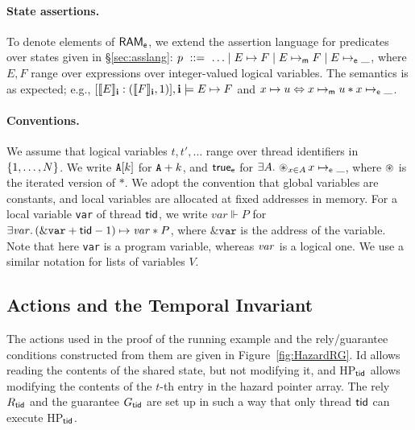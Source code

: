 \paragraph{State assertions.}
To denote elements of ${\sf RAM}_{{\sf e}}$, we extend the assertion language for
predicates over states given in \S\ref{sec:asslang}: $p \ ::=\ \ldots \mid E
\mapsto F \mid E \mapsto_{{\sf m}} F \mid E \mapsto_{{\sf e}} \_$, where $E, F$ range
over expressions over integer-valued logical variables. The semantics is as
expected; e.g., $[\llbracket E \rrbracket_{{\bf i}} : (\llbracket F \rrbracket_{{\bf i}}, 1)],{\bf i} \models E \mapsto F$
and $x \mapsto u \Leftrightarrow x \mapsto_{\sf m} u * x \mapsto_{\sf e} \_$.



\paragraph{Conventions.}
We assume that logical variables $t, t', \ldots$ range over
thread identifiers in $\{1, \ldots, N\}$. We write ${\tt A}[k]$ for
${\tt A}+k$, and $\mathsf{true}_{\sf e}$ for $\exists A.\,\mathop{\circledast}\limits\nolimits_{x \in
  A}x\mapsto_{{\sf e}}\_$, where $\mathop{\circledast}\limits$ is the iterated version of $*$. We adopt
the convention that global variables are constants, and local variables are
allocated at fixed addresses in memory.  For a local variable {\tt var} of
thread ${\sf tid}$, we write $\mathit{var} \Vdash P$ for $\exists \mathit{var}.\,
(\&{\tt var}+{\sf tid}-1) \mapsto \mathit{var} * P$, where $\&\mathtt{var}$ is the address
of the variable. Note that here {\tt var} is a program variable, whereas ${\it
  var}$ is a logical one. We use a similar notation for lists of variables $V$.



\subsection{Actions and the Temporal Invariant \label{sec:hp:actions}}

The actions used in the proof of the running example and the rely/guarantee
conditions constructed from them are given in Figure~\ref{fig:HazardRG}.
\textsf{Id} allows reading the contents of the shared state, but not modifying
it, and \textsf{HP}$_{\sf tid}$ allows modifying the contents of the $t$-th
entry in the hazard
pointer array. The rely $R_{\sf tid}$ and the guarantee $G_{\sf tid}$ are set up in such a way
that only thread ${\sf tid}$ can execute \textsf{HP}$_{\sf tid}$.

